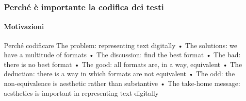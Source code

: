 \begin{frame}
    \frametitle{Perché è importante la codifica dei testi}
    \framesubtitle{Motivazioni}
    \addtocounter{nframe}{1}
    
    \begin{block}{Perché codificare}
    The problem: representing text digitally
• The solutions: we have a multitude of formats
• The discussion: find the best format
• The bad: there is no best format
• The good: all formats are, in a way, equivalent
• The deduction: there is a way in which formats
are not equivalent
• The odd: the non-equivalence is aesthetic rather
than substantive
• The take-home message: aesthetics is
important in representing text digitally 
    \end{block}

    

\end{frame}

